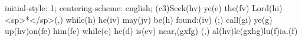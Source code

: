 initial-style: 1;
centering-scheme: english;
(c3)Seek(hv) ye(e) the(fv) Lord(hi) <sp>*</sp>(,) while(h) he(iv) may(jv) be(h) found:(iv) (;) call(gi) ye(g) up(hv)on(fe) him(fe) while(e) he(d) is(ev) near,(gxfg) (,) al(hv)le(gxhg)lu(f)ia.(f)

